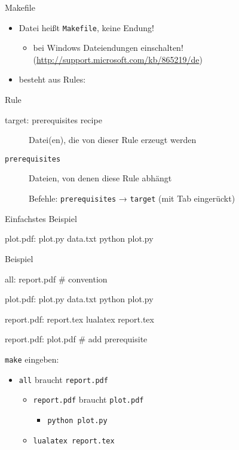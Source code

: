 \begin{frame}[fragile]{Makefile}
  \begin{itemize}
    \item Datei heißt \texttt{Makefile}, keine Endung!
      \begin{itemize}
        \item bei Windows Dateiendungen einschalten! (\url{http://support.microsoft.com/kb/865219/de})
      \end{itemize}
    \item besteht aus Rules:
  \end{itemize}
  \begin{block}{Rule}
    \begin{lstmake}
      target: prerequisites
          recipe
    \end{lstmake}
  \end{block}
  \begin{description}
    \item[\texttt{\hphantom{prerequisites}}] Datei(en), die von dieser Rule erzeugt werden
    \item[\texttt{prerequisites}]                         Dateien, von denen diese Rule abhängt
    \item[\texttt{\hphantom{prerequisites}}] Befehle: \texttt{prerequisites} → \texttt{target} (mit Tab eingerückt)
  \end{description}
\end{frame}

\begin{frame}[fragile]{Einfachstes Beispiel}
  \begin{lstmake}
    plot.pdf: plot.py data.txt
        python plot.py
  \end{lstmake}
\end{frame}

\begin{frame}[fragile]{Beispiel}
  \begin{lstmake}
    all: report.pdf  # convention

    plot.pdf: plot.py data.txt
        python plot.py

    report.pdf: report.tex
        lualatex report.tex

    report.pdf: plot.pdf  # add prerequisite
  \end{lstmake}
  \vspace{1em}

  \texttt{make} eingeben:
  \begin{itemize}
    \item \texttt{all} braucht \texttt{report.pdf}
      \begin{itemize}
        \item \texttt{report.pdf} braucht \texttt{plot.pdf}
          \begin{itemize}
            \item \texttt{python plot.py}
          \end{itemize}
        \item \texttt{lualatex report.tex}
    \end{itemize}
  \end{itemize}
\end{frame}

